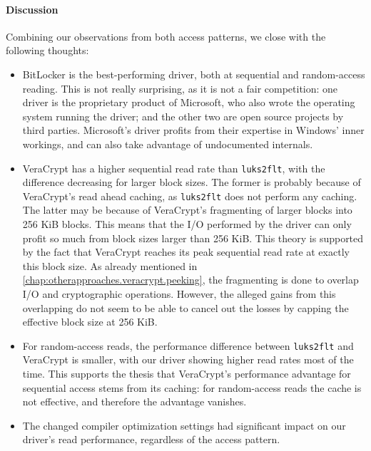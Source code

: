 \paragraph{Discussion}
Combining our observations from both access patterns, we close with the following thoughts:
\begin{itemize}[beginpenalty=10000]
	\item BitLocker is the best-performing driver, both at sequential and random-access reading. This is not really surprising, as it is not a fair competition: one driver is the proprietary product of Microsoft, who also wrote the operating system running the driver; and the other two are open source projects by third parties. Microsoft's driver profits from their expertise in Windows' inner workings, and can also take advantage of undocumented internals.
	\item VeraCrypt has a higher sequential read rate than \texttt{luks2flt}, with the difference decreasing for larger block sizes. The former is probably because of VeraCrypt's read ahead caching, as \texttt{luks2flt} does not perform any caching. The latter may be because of VeraCrypt's fragmenting of larger blocks into 256 KiB blocks. This means that the I/O performed by the driver can only profit so much from block sizes larger than 256 KiB. This theory is supported by the fact that VeraCrypt reaches its peak sequential read rate at exactly this block size. As already mentioned in \autoref{chap:otherapproaches.veracrypt.peeking}, the fragmenting is done to overlap I/O and cryptographic operations. However, the alleged gains from this overlapping do not seem to be able to cancel out the losses by capping the effective block size at 256 KiB.
	\item For random-access reads, the performance difference between \texttt{luks2flt} and VeraCrypt is smaller, with our driver showing higher read rates most of the time. This supports the thesis that VeraCrypt's performance advantage for sequential access stems from its caching: for random-access reads the cache is not effective, and therefore the advantage vanishes.
	\item The changed compiler optimization settings had significant impact on our driver's read performance, regardless of the access pattern.
\end{itemize}


